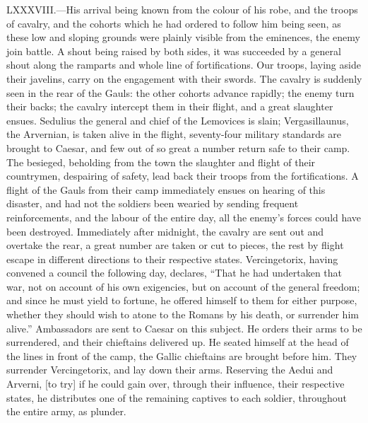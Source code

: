 LXXXVIII.—His arrival being known from the colour of his robe, and the
troops of cavalry, and the cohorts which he had ordered to follow him
being seen, as these low and sloping grounds were plainly visible from
the eminences, the enemy join battle. A shout being raised by both
sides, it was succeeded by a general shout along the ramparts and whole
line of fortifications. Our troops, laying aside their javelins, carry
on the engagement with their swords. The cavalry is suddenly seen in the
rear of the Gauls: the other cohorts advance rapidly; the enemy turn
their backs; the cavalry intercept them in their flight, and a great
slaughter ensues. Sedulius the general and chief of the Lemovices is
slain; Vergasillaunus, the Arvernian, is taken alive in the flight,
seventy-four military standards are brought to Caesar, and few out of so
great a number return safe to their camp. The besieged, beholding from
the town the slaughter and flight of their countrymen, despairing of
safety, lead back their troops from the fortifications. A flight of the
Gauls from their camp immediately ensues on hearing of this disaster,
and had not the soldiers been wearied by sending frequent
reinforcements, and the labour of the entire day, all the enemy's forces
could have been destroyed. Immediately after midnight, the cavalry are
sent out and overtake the rear, a great number are taken or cut to
pieces, the rest by flight escape in different directions to their
respective states. Vercingetorix, having convened a council the
following day, declares, ``That he had undertaken that war, not on
account of his own exigencies, but on account of the general freedom;
and since he must yield to fortune, he offered himself to them for
either purpose, whether they should wish to atone to the Romans by his
death, or surrender him alive.'' Ambassadors are sent to Caesar on this
subject. He orders their arms to be surrendered, and their chieftains
delivered up. He seated himself at the head of the lines in front of the
camp, the Gallic chieftains are brought before him. They surrender
Vercingetorix, and lay down their arms. Reserving the Aedui and Arverni,
[to try] if he could gain over, through their influence, their
respective states, he distributes one of the remaining captives to each
soldier, throughout the entire army, as plunder.

